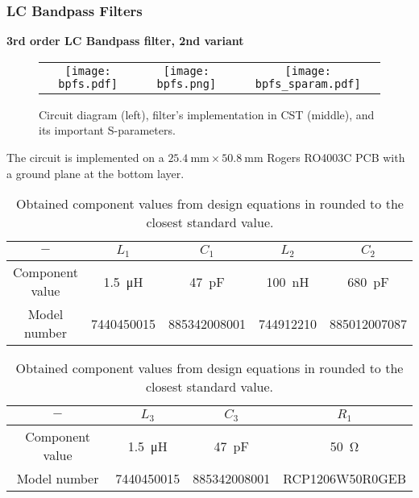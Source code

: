 \begin{frame}
	\frametitle{LC Bandpass Filters}
	\textbf{3rd order LC Bandpass filter, 2nd variant}\\
	\vspace{-50pt}
	\begin{figure}
		\centering
		\begin{tabular}{ccc}
			\texttt{[image: bpfs.pdf]}&
			\texttt{[image: bpfs.png]}&
			\texttt{[image: bpfs\_sparam.pdf]}
		\end{tabular}
		\caption{Circuit diagram (left), filter's implementation in CST (middle), and its important S-parameters.}
	\end{figure}
	\vspace{-20pt}
	The circuit is implemented on a $\SI{25.4}{\milli\meter} \times \SI{50.8}{\milli\meter}$ Rogers RO4003C PCB with a ground plane at the bottom layer.
	\vspace{-20pt}
	\begin{table}[ptbh]
		\centering
		\begin{tabular}{|c|c c c c|}
			\hline
			$-$ & $L_1$ & $C_1$ & $L_2$ & $C_2$ \\
			\hline
			Component value & \SI{1.5}{\micro\henry} & \SI{47}{\pico\farad} & \SI{100}{\nano\henry} & \SI{680}{\pico\farad}\\
			Model number & 7440450015 & 885342008001 & 744912210 & 885012007087\\
			\hline
		\end{tabular} 
		\begin{tabular}{|c|c c c|}
			\hline
			$-$ & $L_3$ & $C_3$ & $R_1$\\
			\hline
			Component value & \SI{1.5}{\micro\henry} & \SI{47}{\pico\farad} & \SI{50}{\ohm}\\
			Model number & 7440450015 & 885342008001 & RCP1206W50R0GEB\\
			\hline
		\end{tabular}
		\caption{Obtained component values from design equations in \cite{lam} rounded to the closest standard value.}
	\end{table}
\end{frame}

